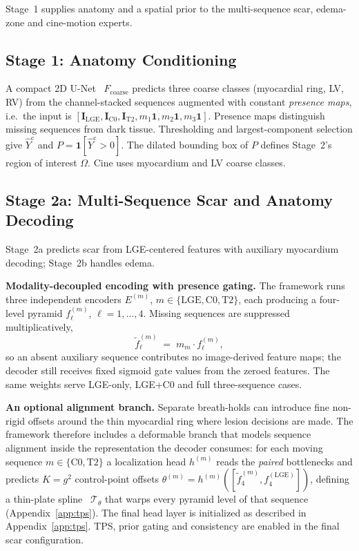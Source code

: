 \documentclass[runningheads]{llncs}
\newcommand{\LGE}{\mathrm{LGE}}
\newcommand{\Cz}{\mathrm{C0}}
\newcommand{\TT}{\mathrm{T2}}
\newcommand{\Img}{\mathbf{I}}
\begin{document}
Stage~1 supplies anatomy and a spatial prior to the multi-sequence scar,
edema-zone and cine-motion experts.

\subsection{Stage 1: Anatomy Conditioning}

A compact 2D U-Net~\cite{ronneberger2015unet} $F_{\text{coarse}}$ predicts three
coarse classes (myocardial ring, LV, RV) from the channel-stacked sequences
augmented with constant \emph{presence maps}, i.e.\ the input is
$[\Img_\LGE,\Img_\Cz,\Img_\TT, m_1\mathbf{1}, m_2\mathbf{1}, m_3\mathbf{1}]$.
Presence maps distinguish missing sequences from dark tissue. Thresholding and
largest-component selection give $\hat{Y}^{\mathrm{c}}$ and
$P=\mathbf{1}[\hat{Y}^{\mathrm{c}}>0]$. The dilated bounding box of $P$ defines
Stage~2's region of interest $\Omega$. Cine uses myocardium and LV coarse classes.

\subsection{Stage 2a: Multi-Sequence Scar and Anatomy Decoding}

Stage~2a predicts scar from LGE-centered features with auxiliary myocardium
decoding; Stage~2b handles edema.

\noindent\textbf{Modality-decoupled encoding with presence gating.} The framework
runs three independent encoders
$E^{(m)}$, $m\in\{\LGE,\Cz,\TT\}$, each producing a four-level pyramid
$f^{(m)}_\ell$, $\ell=1,\dots,4$. Missing sequences are suppressed
multiplicatively,
\begin{equation}
\tilde{f}^{(m)}_\ell \;=\; m_m \cdot f^{(m)}_\ell ,
\end{equation}
so an absent auxiliary sequence contributes no image-derived feature maps; the
decoder still receives fixed sigmoid gate values from the zeroed features. The
same weights serve LGE-only, LGE+C0 and full three-sequence cases.

\noindent\textbf{An optional alignment branch.} Separate breath-holds can
introduce fine non-rigid offsets around the thin myocardial ring where lesion
decisions are made. The framework therefore includes a deformable branch that models
sequence alignment inside the representation the decoder consumes: for each moving
sequence $m\in\{\Cz,\TT\}$ a localization head $h^{(m)}$ reads the \emph{paired}
bottlenecks and predicts $K=g^2$ control-point offsets
$\theta^{(m)}=h^{(m)}([\tilde{f}^{(m)}_4, f^{(\LGE)}_4])$, defining a thin-plate
spline~\cite{bookstein1989principal} $\mathcal{T}_{\theta}$ that warps every
pyramid level of that sequence (Appendix~\ref{app:tps}). The final head layer is initialized as described in Appendix~\ref{app:tps}.
TPS, prior gating and consistency are enabled in the final scar configuration.
\end{document}
